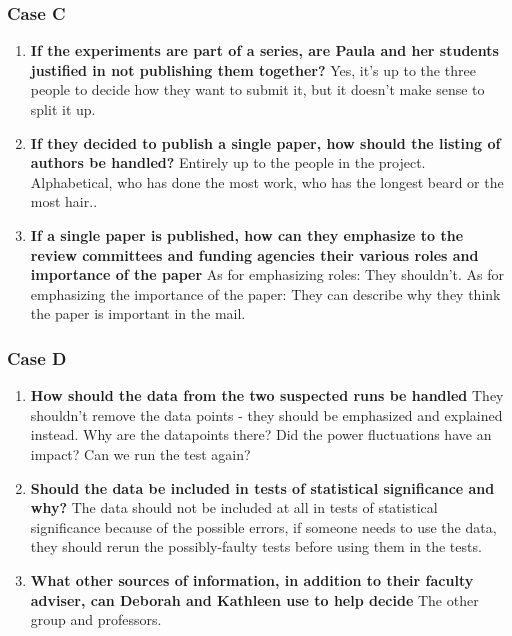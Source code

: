 \subsubsection{Case C}
 
\begin{enumerate}
  \item  \textbf{If the experiments are part of a series, are Paula and her students justified in not publishing them together?} Yes, it’s up to the three people to decide how they want to submit it, but it doesn’t make sense to split it up.
  \item  \textbf{If they decided to publish a single paper, how should the listing of authors be handled?} Entirely up to the people in the project. Alphabetical, who has done the most work, who has the longest beard or the most hair..
  \item  \textbf{If a single paper is published, how can they emphasize to the review committees and funding agencies their various roles and importance of the paper} As for emphasizing roles: They shouldn’t. As for emphasizing the importance of the paper: They can describe why they think the paper is important in the mail.
\end{enumerate}

\subsubsection{Case D}
 
\begin{enumerate}
  \item  \textbf{How should the data from the two suspected runs be handled} They shouldn’t remove the data points - they should be emphasized and explained instead. Why are the datapoints there? Did the power fluctuations have an impact? Can we run the test again? 
  \item  \textbf{Should the data be included in tests of statistical significance and why?} The data should not be included at all in tests of statistical significance because of the possible errors, if someone needs to use the data, they should rerun the possibly-faulty tests before using them in the tests.
  \item  \textbf{What other sources of information, in addition to their faculty adviser, can Deborah and Kathleen use to help decide} The other group and professors.
\end{enumerate}

